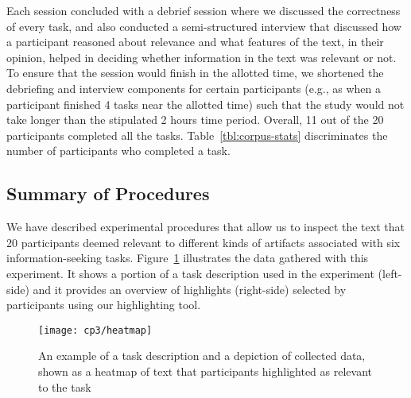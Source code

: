 


Each session concluded with a debrief session where we discussed the
correctness of every task,
and also conducted a semi-structured
interview that discussed how a participant reasoned about relevance
and what features of the text, in their opinion, helped in deciding
whether information in the text was relevant or not.
To ensure that the session would finish in the allotted time,
we shortened the debriefing and interview components 
for certain participants
(e.g., as when a participant finished 4 tasks near the allotted time)
such that the study would not take longer than the stipulated 2 hours time period.
Overall, 11 out of the 20 participants completed all the tasks.
Table~\ref{tbl:corpus-stats} discriminates the number of participants who completed a task.




\subsection{Summary of Procedures}


We have described experimental procedures that allow us to inspect the 
text that 20 participants deemed relevant to different kinds of artifacts 
associated with six information-seeking tasks. 
Figure~\ref{fig:task-highlights-heatmap} illustrates the data gathered with this experiment. 
It shows a portion of a task description used in the experiment (left-side) and it
provides an overview of highlights (right-side) selected by
participants using our highlighting tool.



\begin{figure}
    \centering
    \texttt{[image: cp3/heatmap]}
\caption{An example of a task description and a depiction of collected data, shown as a heatmap of text that participants highlighted as relevant to the task}
\label{fig:task-highlights-heatmap}
\end{figure}







